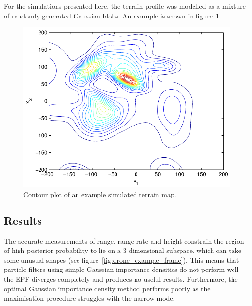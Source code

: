 \documentclass[conference]{IEEEtran}
\begin{document}
For the simulations presented here, the terrain profile was modelled as a mixture of randomly-generated Gaussian blobs. An example is shown in figure~\ref{fig:drone_terrain_map}.
%
\begin{figure}
\centering
\includegraphics[width=0.7\columnwidth]{drone_terrain_map.pdf}
\caption{Contour plot of an example simulated terrain map.}
\label{fig:drone_terrain_map}
\end{figure}

\subsection{Results}

The accurate measurements of range, range rate and height constrain the region of high posterior probability to lie on a $3$ dimensional subspace, which can take some unusual shapes (see figure~\ref{fig:drone_example_frame}). This means that particle filters using simple Gaussian importance densities do not perform well --- the EPF diverges completely and produces no useful results. Furthermore, the optimal Gaussian importance density method performs poorly as the maximisation procedure struggles with the narrow mode.
\end{document}
